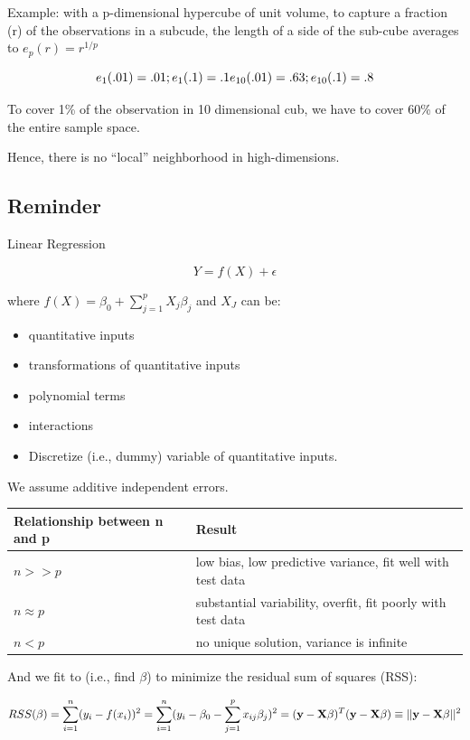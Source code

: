 \documentclass[
]{book}
\begin{document}
Example: with a p-dimensional hypercube of unit volume, to capture a fraction (r) of the observations in a subcude, the length of a side of the sub-cube averages to \(e_p(r) = r^{1/p}\)

\[
e_1(.01) = .01 ; e_1(.1) = .1\\
e_{10}(.01) = .63; e_{10} (.1) = .8
\]

To cover 1\% of the observation in 10 dimensional cub, we have to cover 60\% of the entire sample space.

Hence, there is no ``local'' neighborhood in high-dimensions.

\hypertarget{reminder}{%
\subsection{Reminder}\label{reminder}}

Linear Regression

\[
Y = f(X) + \epsilon
\]

where \(f(X) = \beta_0 + \sum_{j=1}^p X_j \beta_j\) and \(X_J\) can be:

\begin{itemize}
\item
  quantitative inputs
\item
  transformations of quantitative inputs
\item
  polynomial terms
\item
  interactions
\item
  Discretize (i.e., dummy) variable of quantitative inputs.
\end{itemize}

We assume additive independent errors.

\begin{longtable}[]{@{}ll@{}}
\toprule
Relationship between n and p & Result\tabularnewline
\midrule
\endhead
\(n >>p\) & low bias, low predictive variance, fit well with test data\tabularnewline
\(n \approx p\) & substantial variability, overfit, fit poorly with test data\tabularnewline
\(n <p\) & no unique solution, variance is infinite\tabularnewline
\bottomrule
\end{longtable}

And we fit to (i.e., find \(\beta\)) to minimize the residual sum of squares (RSS):

\[
RSS(\beta) = \sum_{i=1}^n(y_i - f(x_i))^2 = \sum_{i=1}^n (y_i -\beta_0 - \sum_{j=1}^p x_{ij} \beta_j)^2 \\
= (\mathbf{y} - \mathbf{X\beta})^T (\mathbf{y} - \mathbf{X\beta}) \equiv  ||\mathbf{y} - \mathbf{X\beta}||^2
\]
\end{document}
